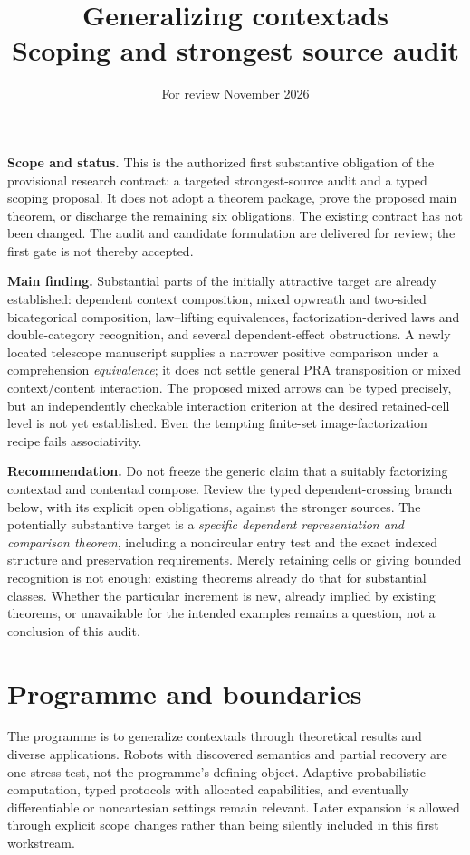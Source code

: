 \documentclass[11pt,a4paper]{article}
\title{Generalizing contextads\\[4pt]\large Scoping and strongest source audit}
\author{}
\date{For review\quad 1 November 2026}
\begin{document}
\maketitle
\vspace{-1.5em}

\textbf{Scope and status.} This is the authorized first substantive obligation
of the provisional research contract: a targeted strongest-source audit and a
typed scoping proposal. It does not adopt a theorem package, prove the proposed
main theorem, or discharge the remaining six obligations. The existing contract
has not been changed. The audit and candidate formulation are delivered for
review; the first gate is not thereby accepted.

\textbf{Main finding.} Substantial parts of the initially attractive target are
already established: dependent context composition, mixed opwreath and
two-sided bicategorical composition, law--lifting equivalences,
factorization-derived laws and double-category recognition, and several
dependent-effect obstructions. A newly located telescope
manuscript supplies a narrower positive comparison under a comprehension
\emph{equivalence}; it does not settle general PRA transposition or mixed
context/content interaction. The proposed mixed arrows can be typed precisely,
but an independently checkable interaction criterion at the desired retained-cell
level is not yet established. Even the tempting finite-set image-factorization
recipe fails associativity.

\textbf{Recommendation.} Do not freeze the generic claim that a suitably
factorizing contextad and contentad compose. Review the typed dependent-crossing
branch below, with its explicit open obligations, against the stronger sources.
The potentially substantive target is a \emph{specific dependent representation
and comparison theorem}, including a noncircular entry test and the exact indexed structure and
preservation requirements. Merely retaining cells or giving bounded recognition
is not enough: existing theorems already do that for substantial classes.
Whether the particular increment is new, already implied by existing
theorems, or unavailable for the intended examples remains a question, not a
conclusion of this audit.

\section{Programme and boundaries}

The programme is to generalize contextads through theoretical results and diverse
applications. Robots with discovered semantics and partial recovery are one stress
test, not the programme's defining object. Adaptive probabilistic computation,
typed protocols with allocated capabilities, and eventually differentiable or
noncartesian settings remain relevant. Later expansion is allowed through explicit
scope changes rather than being silently included in this first workstream.
\end{document}
